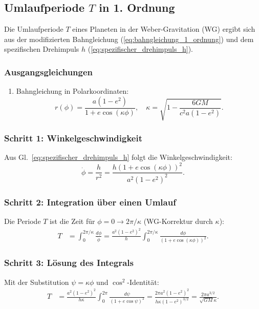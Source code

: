 \newpage
\subsection{Umlaufperiode $T$ in 1. Ordnung}
Die Umlaufperiode $T$ eines Planeten in der Weber-Gravitation (WG) ergibt sich aus der modifizierten Bahngleichung (\ref{eq:bahngleichung_1_ordnung}) und dem spezifischen Drehimpuls $h$ (\ref{eq:spezifischer_drehimpuls_h}).

\subsubsection*{Ausgangsgleichungen}
\begin{enumerate}
    \item Bahngleichung in Polarkoordinaten:
    \begin{equation}
        r(\phi) = \frac{a(1-e^2)}{1 + e \cos(\kappa \phi)}, \quad \kappa = \sqrt{1 - \frac{6GM}{c^2 a(1-e^2)}}.
    \end{equation}    
\end{enumerate}

\subsubsection*{Schritt 1: Winkelgeschwindigkeit}
Aus Gl.~\eqref{eq:spezifischer_drehimpuls_h} folgt die Winkelgeschwindigkeit:
\begin{equation}
    \dot{\phi} = \frac{h}{r^2} = \frac{h(1 + e \cos(\kappa \phi))^2}{a^2(1-e^2)^2}.
\end{equation}

\subsubsection*{Schritt 2: Integration über einen Umlauf}
Die Periode $T$ ist die Zeit für $\phi = 0 \to 2\pi/\kappa$ (WG-Korrektur durch $\kappa$):
\begin{align}
    T &= \int_0^{2\pi/\kappa} \frac{d\phi}{\dot{\phi}} 
       = \frac{a^2(1-e^2)^2}{h} \int_0^{2\pi/\kappa} \frac{d\phi}{(1 + e \cos(\kappa \phi))^2}.
\end{align}

\subsubsection*{Schritt 3: Lösung des Integrals}
Mit der Substitution $\psi = \kappa \phi$ und $\cos^2$-Identität:
\begin{align}
\label{eq:integral_t}
    T &= \frac{a^2(1-e^2)^2}{h \kappa} \int_0^{2\pi} \frac{d\psi}{(1 + e \cos \psi)^2} 
       = \frac{2\pi a^2(1-e^2)^2}{h \kappa (1-e^2)^{3/2}} 
       = \frac{2\pi a^{3/2}}{\sqrt{GM} \kappa}.
\end{align}

